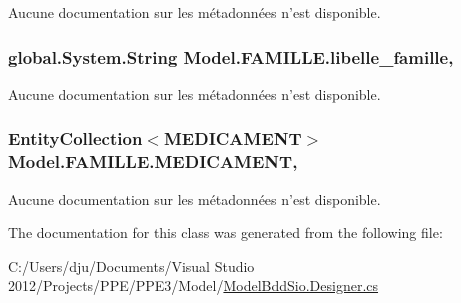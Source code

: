 Aucune documentation sur les métadonnées n'est disponible. 

\hypertarget{class_model_1_1_f_a_m_i_l_l_e_a6ad0fa990e4747965f85c31ff3a67670}{
\subsubsection[{libelle\-\_\-famille}]{\setlength{\rightskip}{0pt plus 5cm}global.\-System.\-String Model.\-F\-A\-M\-I\-L\-L\-E.\-libelle\-\_\-famille\hspace{0.3cm}{\ttfamily [get]}, {\ttfamily [set]}}}\label{class_model_1_1_f_a_m_i_l_l_e_a6ad0fa990e4747965f85c31ff3a67670}


Aucune documentation sur les métadonnées n'est disponible. 

\hypertarget{class_model_1_1_f_a_m_i_l_l_e_a452d5c108f134bb766652c9d5b684512}{
\subsubsection[{M\-E\-D\-I\-C\-A\-M\-E\-N\-T}]{\setlength{\rightskip}{0pt plus 5cm}Entity\-Collection$<${\bf M\-E\-D\-I\-C\-A\-M\-E\-N\-T}$>$ Model.\-F\-A\-M\-I\-L\-L\-E.\-M\-E\-D\-I\-C\-A\-M\-E\-N\-T\hspace{0.3cm}{\ttfamily [get]}, {\ttfamily [set]}}}\label{class_model_1_1_f_a_m_i_l_l_e_a452d5c108f134bb766652c9d5b684512}


Aucune documentation sur les métadonnées n'est disponible. 



The documentation for this class was generated from the following file\-:\begin{DoxyCompactItemize}
\item 
C\-:/\-Users/dju/\-Documents/\-Visual Studio 2012/\-Projects/\-P\-P\-E/\-P\-P\-E3/\-Model/\hyperlink{_model_bdd_sio_8_designer_8cs}{Model\-Bdd\-Sio.\-Designer.\-cs}\end{DoxyCompactItemize}
